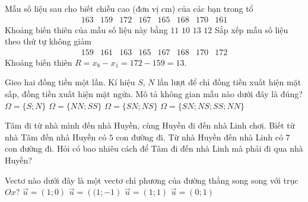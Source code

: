 \begin{ex}%
	Mẫu số liệu sau cho biết chiều cao (đơn vị cm) của các bạn trong tổ
	\[\begin{array}{llllllll}163 & 159 & 172 & 167 & 165 & 168 & 170 & 161\end{array}\]
	Khoảng biến thiên của mẫu số liệu này bằng
	\choice
	{$11$}
	{$10$}
	{\True $13$}
	{$12$}
	\loigiai
	{
		Sắp xếp mẫu số liệu theo thứ tự không giảm
		\[
			\begin{array}{llllllll}
				159 & 161 & 163 & 165 & 167 & 168 & 170 & 172
			\end{array}
		\]
		Khoảng biến thiên $R=x_8-x_1=172-159=13$.
	}
\end{ex}

\begin{ex}%
	Gieo hai đồng tiền một lần. Kí hiệu $S$, $N$ lần lượt để chỉ đồng tiền xuất hiện mặt sấp, đồng tiền xuất hiện mặt ngửa. Mô tả không gian mẫu nào dưới đây là đúng?
	\choice
	{$\Omega=\{S; N\}$}
	{$\Omega=\{NN; SS\}$}
	{$\Omega=\{SN; NS\}$}
	{\True $\Omega=\{SN; NS; SS; NN\}$}
\end{ex}

\begin{ex}%
	Tâm đi từ nhà mình đến nhà Huyền, cùng Huyền đi đến nhà Linh chơi. Biết từ nhà Tâm đến nhà Huyền có $5$ con đường đi. Từ nhà Huyền đến nhà Linh có $7$ con đường đi. Hỏi có bao nhiêu cách để Tâm đi đến nhà Linh mà phải đi qua nhà Huyền?
\end{ex}

\begin{ex}%
	Vectơ nào dưới đây là một vectơ chỉ phương của đường thẳng song song với trục $Ox$?
	\choice
	{\True $\vec u=\left( 1;0 \right)$}
	{$\vec u=\left((1;-1\right)$}
	{$\vec u=\left(1;1\right)$}
	{$\vec u=\left(0;1\right)$}
\end{ex}

